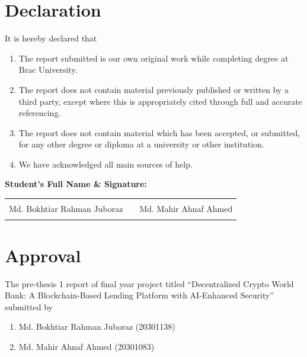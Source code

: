 \documentclass[12pt,a4paper]{report}
\begin{document}
\chapter*{Declaration}

It is hereby declared that

\begin{enumerate}
\item The report submitted is our own original work while completing degree at Brac University.

\item The report does not contain material previously published or written by a third party, except where this is appropriately cited through full and accurate referencing.

\item The report does not contain material which has been accepted, or submitted, for any other degree or diploma at a university or other institution.

\item We have acknowledged all main sources of help.
\end{enumerate}

\vspace{2cm}

\textbf{Student's Full Name \& Signature:}

\vspace{2cm}

\begin{tabular}{p{6cm}p{1cm}p{6cm}}
\hrulefill & & \hrulefill \\
\centering Md. Bokhtiar Rahman Juboraz & & \centering Md. Mahir Ahnaf Ahmed \tabularnewline
\centering 20301138 & & \centering 20301083 \tabularnewline
\end{tabular}

\newpage
\thispagestyle{empty}

\chapter*{Approval}

The pre-thesis 1 report of final year project titled ``Decentralized Crypto World Bank: A Blockchain-Based Lending Platform with AI-Enhanced Security'' submitted by

\begin{enumerate}
\item Md. Bokhtiar Rahman Juboraz (20301138)
\item Md. Mahir Ahnaf Ahmed (20301083)
\end{enumerate}
\end{document}
